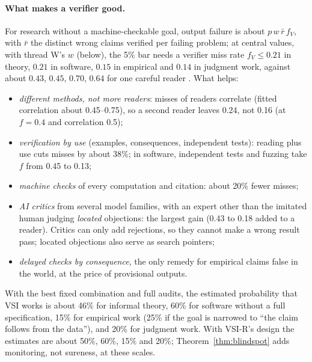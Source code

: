 \documentclass[11pt]{article}
\theoremstyle{definition}
\theoremstyle{remark}
\begin{document}
\paragraph{What makes a verifier good.} For research without a machine-checkable goal, output failure is about $p\,w\,\bar r\,f_V$, with $\bar r$ the distinct wrong claims verified per failing problem; at central values, with thread W's $w$ (below), the 5\% bar needs a verifier miss rate $f_V\le0.21$ in theory, $0.21$ in software, $0.15$ in empirical and $0.14$ in judgment work, against about $0.43$, $0.45$, $0.70$, $0.64$ for one careful reader \cite{threadU}. What helps:
\begin{itemize}[nosep]
\item \emph{different methods, not more readers}: misses of readers correlate (fitted correlation about 0.45--0.75), so a second reader leaves 0.24, not 0.16 (at $f=0.4$ and correlation 0.5);
\item \emph{verification by use} (examples, consequences, independent tests): reading plus use cuts misses by about 38\%; in software, independent tests and fuzzing take $f$ from 0.45 to 0.13;
\item \emph{machine checks} of every computation and citation: about 20\% fewer misses;
\item \emph{AI critics} from several model families, with an expert other than the imitated human judging \emph{located} objections: the largest gain (0.43 to 0.18 added to a reader). Critics can only add rejections, so they cannot make a wrong result pass; located objections also serve as search pointers;
\item \emph{delayed checks by consequence}, the only remedy for empirical claims false in the world, at the price of provisional outputs.
\end{itemize}
With the best fixed combination and full audits, the estimated probability that VSI works is about 46\% for informal theory, 60\% for software without a full specification, 15\% for empirical work (25\% if the goal is narrowed to ``the claim follows from the data''), and 20\% for judgment work. With VSI-R's design the estimates are about 50\%, 60\%, 15\% and 20\%; Theorem~\ref{thm:blindspot} adds monitoring, not sureness, at these scales.
\end{document}
